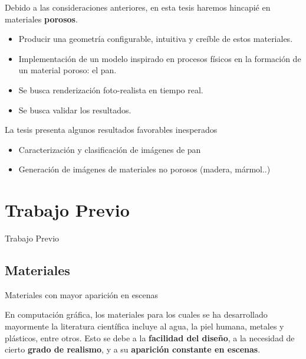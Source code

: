 \documentclass[spanish]{beamer}
\begin{document}
\begin{frame}
\begin{block}{}
Debido a las consideraciones anteriores, en esta tesis haremos hincapié en materiales \textbf{porosos}.

\begin{itemize}
\item Producir una geometría configurable, intuitiva y creíble de estos materiales.
\item Implementación de un modelo inspirado en procesos físicos en la formación de un material poroso: el pan.
\item Se busca renderización foto-realista en tiempo real.
\item Se busca validar los resultados.
\end{itemize}

La tesis presenta algunos resultados favorables inesperados
\begin{itemize}
\item Caracterización y clasificación de imágenes de pan
\item Generación de imágenes de materiales no porosos (madera, mármol..)
\end{itemize}


\end{block}
\end{frame}




\section{Trabajo Previo}

\begin{frame}
\begin{block}{}
\begin{center}
\vspace{1cm}
\huge{Trabajo Previo}
\vspace{1cm}
\end{center}
\end{block}
\end{frame}

\subsection{Materiales}

\begin{frame}{Materiales con mayor aparición en escenas}

En computación gráfica, los materiales para los cuales se ha desarrollado mayormente la literatura científica incluye al agua, la piel humana, metales y plásticos, entre otros. Esto se debe a la \textbf{facilidad del diseño}, a la necesidad de cierto \textbf{grado de realismo}, y a su \textbf{aparición constante en escenas}.

\end{frame}
\end{document}
